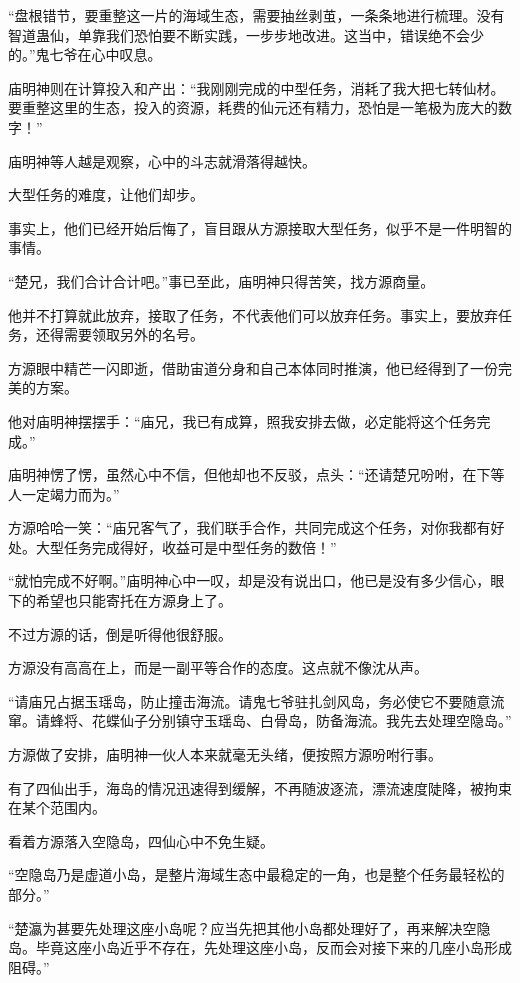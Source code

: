 \begin{this_body}
“盘根错节，要重整这一片的海域生态，需要抽丝剥茧，一条条地进行梳理。没有智道蛊仙，单靠我们恐怕要不断实践，一步步地改进。这当中，错误绝不会少的。”鬼七爷在心中叹息。

庙明神则在计算投入和产出：“我刚刚完成的中型任务，消耗了我大把七转仙材。要重整这里的生态，投入的资源，耗费的仙元还有精力，恐怕是一笔极为庞大的数字！”

庙明神等人越是观察，心中的斗志就滑落得越快。

大型任务的难度，让他们却步。

事实上，他们已经开始后悔了，盲目跟从方源接取大型任务，似乎不是一件明智的事情。

“楚兄，我们合计合计吧。”事已至此，庙明神只得苦笑，找方源商量。

他并不打算就此放弃，接取了任务，不代表他们可以放弃任务。事实上，要放弃任务，还得需要领取另外的名号。

方源眼中精芒一闪即逝，借助宙道分身和自己本体同时推演，他已经得到了一份完美的方案。

他对庙明神摆摆手：“庙兄，我已有成算，照我安排去做，必定能将这个任务完成。”

庙明神愣了愣，虽然心中不信，但他却也不反驳，点头：“还请楚兄吩咐，在下等人一定竭力而为。”

方源哈哈一笑：“庙兄客气了，我们联手合作，共同完成这个任务，对你我都有好处。大型任务完成得好，收益可是中型任务的数倍！”

“就怕完成不好啊。”庙明神心中一叹，却是没有说出口，他已是没有多少信心，眼下的希望也只能寄托在方源身上了。

不过方源的话，倒是听得他很舒服。

方源没有高高在上，而是一副平等合作的态度。这点就不像沈从声。

“请庙兄占据玉瑶岛，防止撞击海流。请鬼七爷驻扎剑风岛，务必使它不要随意流窜。请蜂将、花蝶仙子分别镇守玉瑶岛、白骨岛，防备海流。我先去处理空隐岛。”

方源做了安排，庙明神一伙人本来就毫无头绪，便按照方源吩咐行事。

有了四仙出手，海岛的情况迅速得到缓解，不再随波逐流，漂流速度陡降，被拘束在某个范围内。

看着方源落入空隐岛，四仙心中不免生疑。

“空隐岛乃是虚道小岛，是整片海域生态中最稳定的一角，也是整个任务最轻松的部分。”

“楚瀛为甚要先处理这座小岛呢？应当先把其他小岛都处理好了，再来解决空隐岛。毕竟这座小岛近乎不存在，先处理这座小岛，反而会对接下来的几座小岛形成阻碍。”


\end{this_body}
